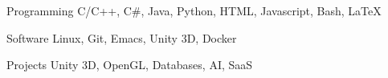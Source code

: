 

\begin{cvskills}

  \cvskill
    {Programming} %
    {C/C++, C\#, Java, Python, HTML, Javascript, Bash, LaTeX}

  \cvskill
    {Software} %
    {Linux, Git, Emacs, Unity 3D, Docker} %

  \cvskill
    {Projects} %
    {Unity 3D, OpenGL, Databases, AI, SaaS} %


\end{cvskills}
